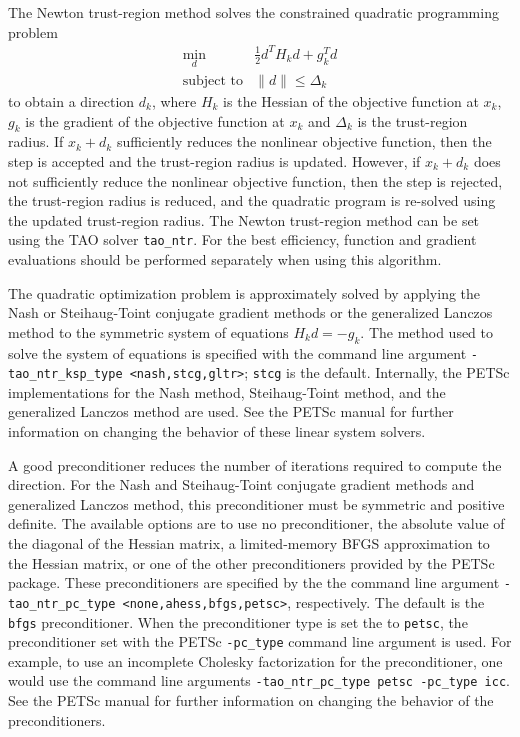 The Newton trust-region method solves the constrained quadratic programming
problem
\[
\begin{array}{ll}
\min_d  & \frac{1}{2}d^T H_k d  + g_k^T d \\
\mbox{subject to} & \|d\| \leq \Delta_k
\end{array}
\]
to obtain a direction $d_k$, where $H_k$ is the Hessian of the objective 
function at $x_k$, $g_k$ is the gradient of the objective function at $x_k$ 
and $\Delta_k$ is the trust-region radius.  If $x_k + d_k$ sufficiently 
reduces the nonlinear objective function, then the step is accepted and the 
trust-region radius is updated.  However, if $x_k + d_k$ does not sufficiently
reduce the nonlinear objective function, then the step is rejected, the 
trust-region radius is reduced, and the quadratic program is re-solved 
using the updated trust-region radius. The Newton trust-region method 
can be set using the TAO solver {\tt tao\_ntr}.  For the best efficiency, 
function and gradient evaluations should be performed separately when 
using this algorithm.

The quadratic optimization problem is approximately solved by applying
the Nash or Steihaug-Toint conjugate gradient methods or the 
generalized Lanczos 
method to the symmetric system of equations $H_k d = -g_k$.  The method 
used to solve the system of equations is specified with the command line
argument {\tt -tao\_ntr\_ksp\_type <nash,stcg,gltr>}; {\tt stcg} is the default.  
Internally, the PETSc implementations for the Nash method, Steihaug-Toint 
method, and the generalized Lanczos method are used.  See the PETSc manual 
for further information on changing the behavior of these linear system 
solvers.  

A good preconditioner reduces the number of iterations required to
compute the direction.  For the Nash and Steihaug-Toint conjugate gradient
methods and generalized Lanczos method, this preconditioner must be
symmetric and positive definite.  The available options are to use no
preconditioner, the absolute value of the diagonal of the Hessian
matrix, a limited-memory BFGS approximation to the Hessian matrix, or
one of the other preconditioners provided by the PETSc package.  These
preconditioners are specified by the the command line argument 
{\tt -tao\_ntr\_pc\_type <none,ahess,bfgs,petsc>}, respectively.  The
default is the {\tt bfgs} preconditioner.  When the preconditioner
type is set the to {\tt petsc}, the preconditioner set with the PETSc
{\tt -pc\_type} command line argument is used.  For example, to use an
incomplete Cholesky factorization for the preconditioner, one would
use the command line arguments 
{\tt -tao\_ntr\_pc\_type petsc -pc\_type icc}.  See the PETSc manual 
for further information on changing the behavior of the preconditioners.

